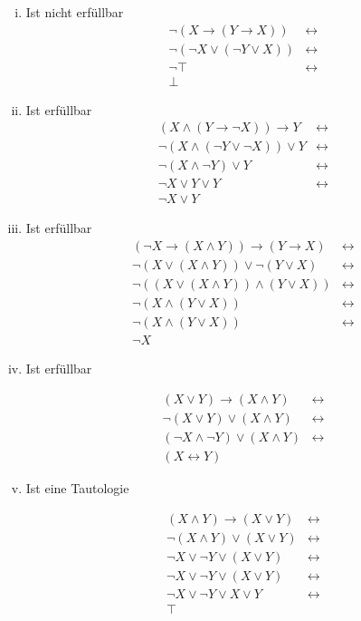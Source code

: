 \documentclass[a4paper,10pt]{scrartcl}
\begin{document}
\begin{enumerate}[(i)]
\item Ist nicht erfüllbar
\begin{align*}
\lnot(X \to (Y \to X)) &\leftrightarrow \\
\lnot(\lnot X \lor (\lnot Y \lor X)) &\leftrightarrow \\
\lnot\top &\leftrightarrow \\
\bot
\end{align*}

\item Ist erfüllbar
\begin{align*}
(X \land (Y \to \lnot X)) \to Y &\leftrightarrow \\
\lnot(X \land (\lnot Y \lor \lnot X)) \lor Y &\leftrightarrow \\
\lnot(X \land \lnot Y) \lor Y &\leftrightarrow \\
\lnot X \lor Y \lor Y &\leftrightarrow \\
\lnot X \lor Y
\end{align*}

\item Ist erfüllbar
\begin{align*}
(\lnot X \to (X \land Y)) \to (Y \to X) &\leftrightarrow \\
\lnot (X \lor (X \land Y)) \lor \lnot(Y \lor X) &\leftrightarrow\\
\lnot ((X \lor (X \land Y)) \land (Y \lor X)) &\leftrightarrow\\
\lnot (X \land (Y \lor X)) &\leftrightarrow\\
\lnot (X \land (Y \lor X)) &\leftrightarrow\\
\lnot X
\end{align*}

\item Ist erfüllbar

\begin{align*}
(X \lor Y) \to (X \land Y) &\leftrightarrow\\
\lnot(X \lor Y) \lor (X \land Y) &\leftrightarrow\\
(\lnot X \land \lnot Y) \lor (X \land Y) &\leftrightarrow\\
(X \leftrightarrow Y)
\end{align*}

\item Ist eine Tautologie

\begin{align*}
(X \land Y ) \to (X \lor Y) &\leftrightarrow \\
\lnot (X \land Y ) \lor (X \lor Y) &\leftrightarrow\\
\lnot X \lor \lnot Y \lor (X \lor Y) &\leftrightarrow\\
\lnot X \lor \lnot Y \lor (X \lor Y) &\leftrightarrow\\
\lnot X \lor \lnot Y \lor X \lor Y &\leftrightarrow\\
\top
\end{align*}
\end{enumerate}
\end{document}
